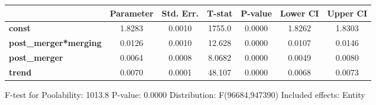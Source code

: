 \documentclass{report}a
\begin{document}
\begin{center}
\begin{tabular}{lcccccc}
                              & \textbf{Parameter} & \textbf{Std. Err.} & \textbf{T-stat} & \textbf{P-value} & \textbf{Lower CI} & \textbf{Upper CI}  \\
\midrule
\textbf{const}                &       1.8283       &       0.0010       &      1755.0     &      0.0000      &       1.8262      &       1.8303       \\
\textbf{post\_merger*merging} &       0.0126       &       0.0010       &      12.628     &      0.0000      &       0.0107      &       0.0146       \\
\textbf{post\_merger}         &       0.0064       &       0.0008       &      8.0682     &      0.0000      &       0.0049      &       0.0080       \\
\textbf{trend}                &       0.0070       &       0.0001       &      48.107     &      0.0000      &       0.0068      &       0.0073       \\
\bottomrule
\end{tabular}
\end{center}

F-test for Poolability: 1013.8 \newline
 P-value: 0.0000 \newline
 Distribution: F(96684,947390) \newline
  \newline
 Included effects: Entity
\end{document}
